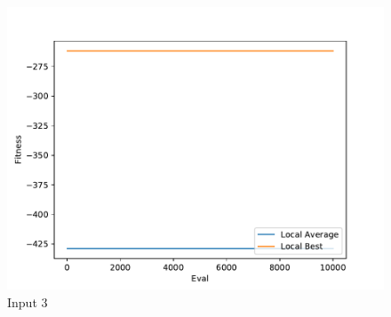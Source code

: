 \documentclass{standalone}
\begin{document}
\begin{figure}[!htb]
	\caption{Input 3}
	\label{fig:graph_3032}
	\includegraphics[width=\textwidth]{../graphs/graphs/3032.pdf}
\end{figure}
\end{document}
